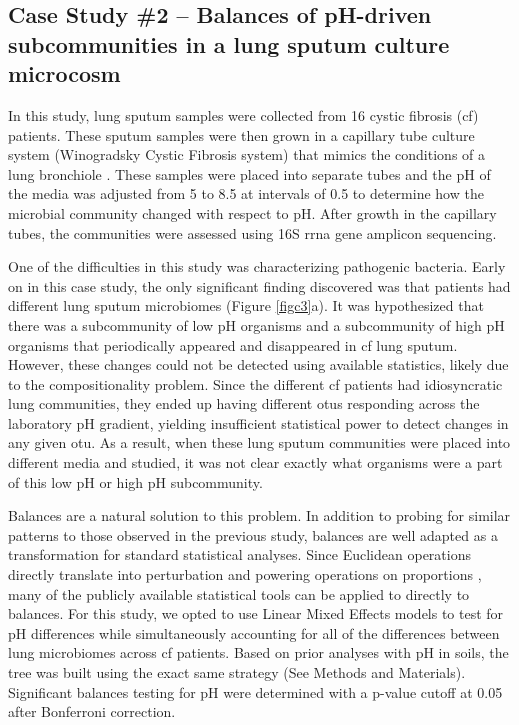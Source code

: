  \subsection{Case Study \#2 – Balances of pH-driven subcommunities in a lung sputum culture microcosm}
 In this study, lung sputum samples were collected from 16 cystic fibrosis (\gls{cf}) patients.  These sputum samples were then grown in a capillary tube culture system (Winogradsky Cystic Fibrosis system) that mimics the conditions of a lung bronchiole \cite{wincf}.  These samples were placed into separate tubes and the pH of the media was adjusted from 5 to 8.5 at intervals of 0.5 to determine how the microbial community changed with respect to pH.  After growth in the capillary tubes, the communities were assessed using 16S \gls{rrna} gene amplicon sequencing.\par
 One of the difficulties in this study was characterizing pathogenic bacteria.  Early on in this case study, the only significant finding discovered was that patients had different lung sputum microbiomes (Figure \ref{figc3}a). It was hypothesized that there was a subcommunity of low pH organisms and a subcommunity of high pH organisms that periodically appeared and disappeared in \gls{cf} lung sputum.  However, these changes could not be detected using available statistics, likely due to the compositionality problem.  Since the different \gls{cf} patients had idiosyncratic lung communities, they ended up having different \gls{otu}s responding across the laboratory pH gradient, yielding insufficient statistical power to detect changes in any given \gls{otu}.  As a result, when these lung sputum communities were placed into different media and studied, it was not clear exactly what organisms were a part of this low pH or high pH subcommunity.  \par
 Balances are a natural solution to this problem.  In addition to probing for similar patterns to those observed in the previous study, balances are well adapted as a transformation for standard statistical analyses.  Since Euclidean operations directly translate into perturbation and powering operations on proportions \cite{ilr, Pawlowsky-Glahn2015-qb}, many of the publicly available statistical tools can be applied to directly to balances.  For this study, we opted to use Linear Mixed Effects models to test for pH differences while simultaneously accounting for all of the differences between lung microbiomes across \gls{cf} patients.   Based on prior analyses with pH in soils, the tree was built using the exact same strategy (See Methods and Materials).   Significant balances testing for pH were determined with a p-value cutoff at 0.05 after Bonferroni correction.  \par
